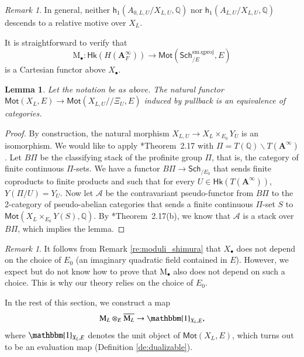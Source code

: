 \documentclass[12pt]{amsart}
\numberwithin{equation}{section}
\theoremstyle{plain}
\newtheorem{lem}[proposition]{Lemma}
\theoremstyle{definition}
\theoremstyle{remark}
\newtheorem{remark}[proposition]{Remark}
\renewcommand{\b}[1]{\mathbf{#1}}
\renewcommand{\c}[1]{\mathcal{#1}}
\renewcommand{\d}[1]{\mathbb{#1}}
\renewcommand{\r}[1]{\mathrm{#1}}
\renewcommand{\sf}[1]{\mathsf{#1}}
\renewcommand{\(}{\left(}
\renewcommand{\)}{\right)}
\newcommand{\ol}[1]{\overline{#1}{}}
\newcommand{\bA}{\b A}
\newcommand{\cA}{\c A}
\newcommand{\dQ}{\d Q}
\newcommand{\rM}{\r M}
\newcommand{\sfh}{\sf h}
\newcommand{\smq}{\r{sm.qproj}}
\newcommand{\Sch}{\sf{Sch}}
\newcommand{\Hk}{\sf{Hk}}
\newcommand{\Mot}{\sf{Mot}}
\begin{document}
\begin{remark}
In general, neither $\sfh_1(A_{0,L,U}/X_{L,U},\dQ)$ nor $\sfh_1(A_{L,U}/X_{L,U},\dQ)$ descends to a relative motive over $X_L$.
\end{remark}


It is straightforward to verify that
\[
\rM_\bullet\colon\Hk(H(\bA_F^\infty))\to\Mot(\Sch^\smq_{/E},E)
\]
is a Cartesian functor above $X_\bullet$.


\begin{lem}\label{le:motive_descent}
Let the notation be as above. The natural functor $\Mot(X_L,E)\to\Mot(X_{L,U}/\!\!/\Xi_U,E)$ induced by pullback is an equivalence of categories.
\end{lem}

\begin{proof}
By construction, the natural morphism $X_{L,U}\to X_L\times_{E_0}Y_U$ is an isomorphism. We would like to apply \cite{Kah}*{Theorem~2.17} with $\Pi=T(\dQ)\backslash T(\bA^\infty)$. Let $B\Pi$ be the classifying stack of the profinite group $\Pi$, that is, the category of finite continuous $\Pi$-sets. We have a functor $B\Pi\to\Sch_{/E_0}$ that sends finite coproducts to finite products and such that for every $U\in\Hk(T(\bA^\infty))$, $Y(\Pi/U)=Y_U$. Now let $\cA$ be the contravariant pseudo-functor from $B\Pi$ to the 2-category of pseudo-abelian categories that sends a finite continuous $\Pi$-set $S$ to $\Mot(X_L\times_{E_0}Y(S),\dQ)$. By \cite{Kah}*{Theorem~2.17(b)}, we know that $\cA$ is a stack over $B\Pi$, which implies the lemma.
\end{proof}


\begin{remark}
It follows from Remark \ref{re:moduli_shimura} that $X_\bullet$ does not depend on the choice of $E_0$ (an imaginary quadratic field contained in $E$). However, we expect but do not know how to prove that $\rM_\bullet$ also does not depend on such a choice. This is why our theory relies on the choice of $E_0$.
\end{remark}


In the rest of this section, we construct a map
\begin{align}\label{eq:evaluation_motive_standard}
\rM_L\otimes_E\ol{\rM_L}\to\mathbbm{1}_{X_L,E},
\end{align}
where $\mathbbm{1}_{X_L,E}$ denotes the unit object of $\Mot(X_L,E)$, which turns out to be an evaluation map (Definition \ref{de:dualizable}).
\end{document}
